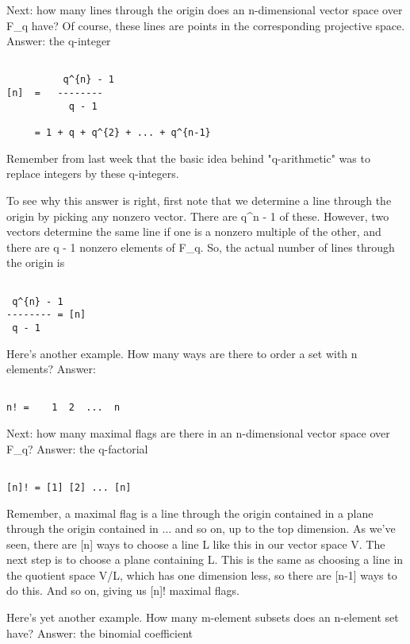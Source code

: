 Next: how many lines through the origin does an n-dimensional vector
space over F_{q} have?  Of course, these lines are points in the
corresponding projective space.  Answer: the q-integer


\begin{verbatim}

          q^{n} - 1
[n]  =   --------   
           q - 1

     = 1 + q + q^{2} + ... + q^{n-1}
\end{verbatim}
    
Remember from last week that the basic idea behind "q-arithmetic" was
to replace integers by these q-integers.  

To see why this answer is right, first note that we determine a line
through the origin by picking any nonzero vector.  There are q^{n} - 1
of these.  However, two vectors determine the same line if one is a
nonzero multiple of the other, and there are q - 1 nonzero elements 
of F_{q}.  So, the actual number of lines through the origin is


\begin{verbatim}

 q^{n} - 1
-------- = [n]
 q - 1
\end{verbatim}
    
Here's another example.  How many ways are there to order a set with n
elements?  Answer:


\begin{verbatim}

n! =    1  2  ...  n
\end{verbatim}
    
Next: how many maximal flags are there in an n-dimensional vector space
over F_{q}?  Answer: the q-factorial 


\begin{verbatim}

[n]! = [1] [2] ... [n]
\end{verbatim}
    
Remember, a maximal flag is a line through the origin contained in a
plane through the origin contained in ... and so on, up to the top
dimension.  As we've seen, there are [n] ways to choose a line L like
this in our vector space V.  The next step is to choose a plane
containing L.  This is the same as choosing a line in the quotient space
V/L, which has one dimension less, so there are [n-1] ways to do this. 
And so on, giving us [n]! maximal flags.

Here's yet another example.  How many m-element subsets does an
n-element set have?  Answer: the binomial coefficient 


